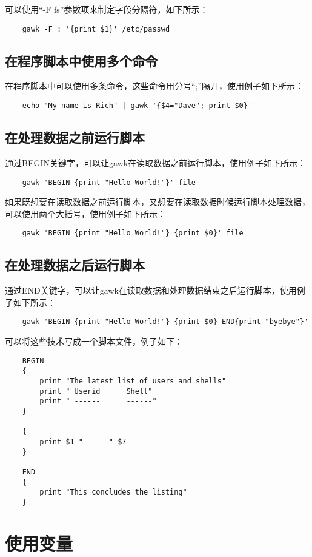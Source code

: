 \documentclass[a4paper,left=2.5cm,right=2.5cm,11pt]{article}
\begin{document}
	可以使用“-F fs”参数项来制定字段分隔符，如下所示：
	\begin{lstlisting}
	gawk -F : '{print $1}' /etc/passwd
	\end{lstlisting}

\subsection{在程序脚本中使用多个命令}
	在程序脚本中可以使用多条命令，这些命令用分号“;”隔开，使用例子如下所示：
	\begin{lstlisting}
	echo "My name is Rich" | gawk '{$4="Dave"; print $0}'
	\end{lstlisting}

\subsection{在处理数据之前运行脚本}
	通过BEGIN关键字，可以让gawk在读取数据之前运行脚本，使用例子如下所示：
	\begin{lstlisting}
	gawk 'BEGIN {print "Hello World!"}' file
	\end{lstlisting}

	如果既想要在读取数据之前运行脚本，又想要在读取数据时候运行脚本处理数据，可以使用两个大括号，使用例子如下所示：
	\begin{lstlisting}
	gawk 'BEGIN {print "Hello World!"} {print $0}' file
	\end{lstlisting}

\subsection{在处理数据之后运行脚本}
	通过END关键字，可以让gawk在读取数据和处理数据结束之后运行脚本，使用例子如下所示：
	\begin{lstlisting}
	gawk 'BEGIN {print "Hello World!"} {print $0} END{print "byebye"}'
	\end{lstlisting}

	可以将这些技术写成一个脚本文件，例子如下：
	\begin{lstlisting}
	BEGIN
	{
		print "The latest list of users and shells"
		print " Userid		Shell"
		print " ------		------"
	}

	{
		print $1 "		" $7
	}

	END
	{
		print "This concludes the listing"
	}
	\end{lstlisting}

\section{使用变量}
\end{document}
